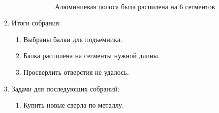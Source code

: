 \begin{enumerate}
\begin{enumerate}
\begin{enumerate}
      	\begin{figure}[H]
      		\begin{minipage}[h]{0.2\linewidth}
      			\center  
      		\end{minipage}
      		\begin{minipage}[h]{0.6\linewidth}
      			\caption{Алюминиевая полоса была распилена на 6 сегментов}
      		\end{minipage}
      	\end{figure}
      	
      \end{enumerate}
      
    \end{enumerate}
    
	\item Итоги собрания: \newline
	\begin{enumerate}
	  \item Выбраны балки для подъемника.\newline
	  
	  \item Балка распилена на сегменты нужной длины.\newline
	  
	  \item Просверлить отверстия не удалось.\newline
	   
    \end{enumerate}
    
	\item Задачи для последующих собраний:\newline
	\begin{enumerate}
	  \item Купить новые сверла по металлу.\newline
	  
    \end{enumerate}     
\end{enumerate}

\fillpage
